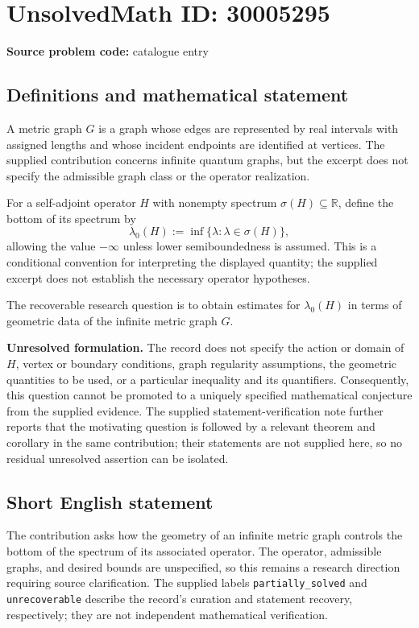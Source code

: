 \documentclass[11pt]{article}
\newcommand{\R}{\mathbb{R}}
\begin{document}
\section*{UnsolvedMath ID: 30005295}
\textbf{Source problem code:} catalogue entry
\subsection{Definitions and mathematical statement}
A metric graph \(G\) is a graph whose edges are represented by real intervals with assigned lengths and whose incident endpoints are identified at vertices. The supplied contribution concerns infinite quantum graphs, but the excerpt does not specify the admissible graph class or the operator realization.

For a self-adjoint operator \(H\) with nonempty spectrum \(\sigma(H)\subseteq\R\), define the bottom of its spectrum by
\[
\lambda_0(H):=\inf\{\lambda:\lambda\in\sigma(H)\},
\]
allowing the value \(-\infty\) unless lower semiboundedness is assumed. This is a conditional convention for interpreting the displayed quantity; the supplied excerpt does not establish the necessary operator hypotheses.

The recoverable research question is to obtain estimates for \(\lambda_0(H)\) in terms of geometric data of the infinite metric graph \(G\).

\textbf{Unresolved formulation.} The record does not specify the action or domain of \(H\), vertex or boundary conditions, graph regularity assumptions, the geometric quantities to be used, or a particular inequality and its quantifiers. Consequently, this question cannot be promoted to a uniquely specified mathematical conjecture from the supplied evidence. The supplied statement-verification note further reports that the motivating question is followed by a relevant theorem and corollary in the same contribution; their statements are not supplied here, so no residual unresolved assertion can be isolated.
\subsection{Short English statement}
The contribution asks how the geometry of an infinite metric graph controls the bottom of the spectrum of its associated operator. The operator, admissible graphs, and desired bounds are unspecified, so this remains a research direction requiring source clarification. The supplied labels \texttt{partially\_solved} and \texttt{unrecoverable} describe the record's curation and statement recovery, respectively; they are not independent mathematical verification.
\end{document}
